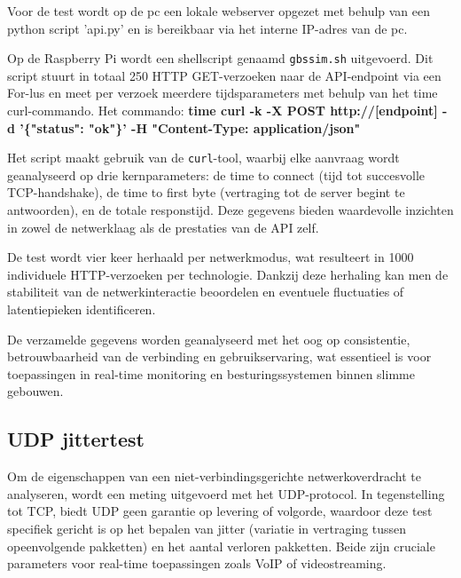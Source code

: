 Voor de test wordt op de pc een lokale webserver opgezet met behulp van een python script 'api.py' en is bereikbaar via het interne IP-adres van de pc. 

%    
%    
%    

Op de Raspberry Pi wordt een shellscript genaamd \texttt{gbssim.sh} uitgevoerd. Dit script stuurt in totaal 250 HTTP GET-verzoeken naar de API-endpoint via een For-lus en meet per verzoek meerdere tijdsparameters met behulp van het time curl-commando. Het commando: \textbf{time curl -k -X POST http://[endpoint] -d '\{"status": "ok"\}' -H "Content-Type: application/json"}

Het script maakt gebruik van de \texttt{curl}-tool, waarbij elke aanvraag wordt geanalyseerd op drie kernparameters: de time to connect (tijd tot succesvolle TCP-handshake), de time to first byte (vertraging tot de server begint te antwoorden), en de totale responstijd. Deze gegevens bieden waardevolle inzichten in zowel de netwerklaag als de prestaties van de API zelf.

De test wordt vier keer herhaald per netwerkmodus, wat resulteert in 1000 individuele HTTP-verzoeken per technologie. Dankzij deze herhaling kan men de stabiliteit van de netwerkinteractie beoordelen en eventuele fluctuaties of latentiepieken identificeren.

De verzamelde gegevens worden geanalyseerd met het oog op consistentie, betrouwbaarheid van de verbinding en gebruikservaring, wat essentieel is voor toepassingen in real-time monitoring en besturingssystemen binnen slimme gebouwen.


\subsection{UDP jittertest}
Om de eigenschappen van een niet-verbindingsgerichte netwerkoverdracht te analyseren, wordt een meting uitgevoerd met het UDP-protocol. In tegenstelling tot TCP, biedt UDP geen garantie op levering of volgorde, waardoor deze test specifiek gericht is op het bepalen van jitter (variatie in vertraging tussen opeenvolgende pakketten) en het aantal verloren pakketten. Beide zijn cruciale parameters voor real-time toepassingen zoals VoIP of videostreaming.

